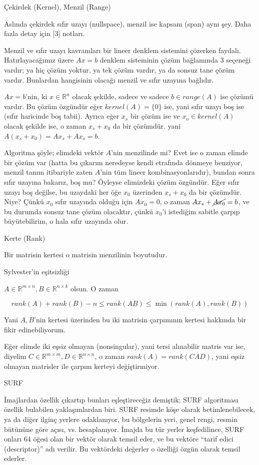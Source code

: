 \documentclass[12pt,fleqn]{article}\usepackage{../../common}
\begin{document}
Çekirdek (Kernel), Menzil (Range)

Aslında çekirdek sıfır uzayı (nullspace), menzil ise kapsam (span) aynı
şey. Daha fazla detay için [3] notları.

Menzil ve sıfır uzayı kavramları bir lineer denklem sistemini çözerken
faydalı. Hatırlayacağımız üzere $Ax = b$ denklem sisteminin çözüm
bağlamında 3 seçeneği vardır; ya hiç çözüm yoktur, ya tek çözüm vardır, ya
da sonsuz tane çözüm vardır. Bunlardan hangisinin olacağı menzil ve sıfır
uzayına bağlıdır. 

$Ax=b$'nin, ki $x \in \mathbb{R}^n$ olacak şekilde, sadece ve sadece $b \in
range(A)$ ise çözümü vardır. Bu çözüm özgündür eğer $kernel(A) =\{0\}$ ise,
yani sıfır uzayı boş ise (sıfır haricinde boş tabii). Ayrıca eğer $x_s$ bir
çözüm ise ve $x_o \in kernel(A)$ olacak şekilde ise, o zaman $x_s + x_0$ da
bir çözümdür. yani $A(x_s+x_0) = Ax_s + Ax_o = b$.

Algoritma şöyle; elimdeki vektör $A$'nin menzilinde mi? Evet ise o zaman
elimde bir çözüm var (hatta bu çıkarım neredeyse kendi etrafında dönmeye
benziyor, menzil tanım itibariyle zaten $A$'nin tüm lineer
kombinasyonlarıdır), bundan sonra sıfır uzayına bakarız, boş mu? Öyleyse
elimizdeki çözüm özgündür. Eğer sıfır uzayı boş değilse, bu uzaydaki her
öğe $x_0$ üzerinden $x_s+x_0$ da bir çözümdür. Niye? Çünkü $x_0$ sıfır
uzayında olduğu için $Ax_0 = 0$, o zaman $Ax_s + \cancel{Ax_0} = b$, ve bu
durumda sonsuz tane çözüm olacaktır, çünkü $x_0$'i istediğim sabitle çarpıp
büyütebilirim, o hala sıfır uzayında olur. 

Kerte (Rank)

Bir matrisin kertesi o matrisin menzilinin boyutudur. 

Sylvester'in eşitsizliği

$A \in \mathbb{R}^{m \times n}, B \in \mathbb{R}^{n \times k}$ olsun. O zaman 

$$ rank(A) + rank(B) - n \le rank(AB) \le \min(rank(A),rank(B)) $$

Yani $A,B$'nin kertesi üzerinden bu iki matrisin çarpımının kertesi
hakkında bir fikir edinebiliyorum. 

Eğer elimde iki eşsiz olmayan (nonsingular), yani tersi alınabilir matris var
ise, diyelim $C \in \mathbb{R}^{m \times m}, D \in \mathbb{R}^{n \times n}$, o
zaman $rank(A) = rank(CAD)$, yani eşsiz olmayan matrisler ile çarpım kerteyi
değiştirmiyor.

SURF

İmajlardan özellik çıkartıp bunları eşleştireceğiz demiştik; SURF
algoritması özellik bulabilen yaklaşımlardan biri. SURF resimde köşe olarak
betimlenebilecek, ya da diğer ilginç yerlere odaklanıyor, bu bölgelerin
yeri, genel rengi, resmin bütününe göre açısı, vs. hesaplanıyor. İmajda bu
tür yerler keşfedilince, SURF onları 64 öğesi olan bir vektör olarak temsil
eder, ve bu vektöre ``tarif edici (descriptor)'' adı verilir. Bu vektördeki
değerler o özelliği özgün olarak temsil ederler. 
\end{document}
